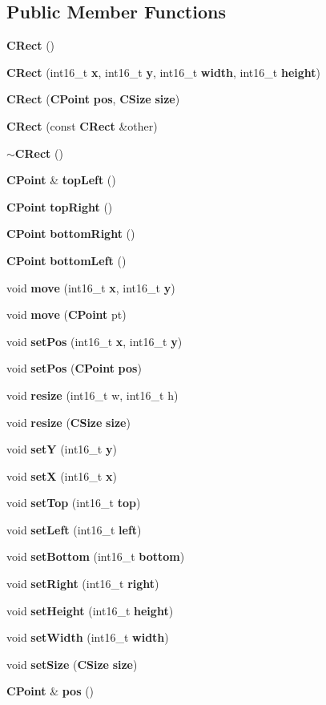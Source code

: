 \subsection*{Public Member Functions}
\begin{DoxyCompactItemize}
\item 
{\bf C\-Rect} ()
\item 
{\bf C\-Rect} (int16\-\_\-t {\bf x}, int16\-\_\-t {\bf y}, int16\-\_\-t {\bf width}, int16\-\_\-t {\bf height})
\item 
{\bf C\-Rect} ({\bf C\-Point} {\bf pos}, {\bf C\-Size} {\bf size})
\item 
{\bf C\-Rect} (const {\bf C\-Rect} \&other)
\item 
{\bf $\sim$\-C\-Rect} ()
\item 
{\bf C\-Point} \& {\bf top\-Left} ()
\item 
{\bf C\-Point} {\bf top\-Right} ()
\item 
{\bf C\-Point} {\bf bottom\-Right} ()
\item 
{\bf C\-Point} {\bf bottom\-Left} ()
\item 
void {\bf move} (int16\-\_\-t {\bf x}, int16\-\_\-t {\bf y})
\item 
void {\bf move} ({\bf C\-Point} pt)
\item 
void {\bf set\-Pos} (int16\-\_\-t {\bf x}, int16\-\_\-t {\bf y})
\item 
void {\bf set\-Pos} ({\bf C\-Point} {\bf pos})
\item 
void {\bf resize} (int16\-\_\-t w, int16\-\_\-t h)
\item 
void {\bf resize} ({\bf C\-Size} {\bf size})
\item 
void {\bf set\-Y} (int16\-\_\-t {\bf y})
\item 
void {\bf set\-X} (int16\-\_\-t {\bf x})
\item 
void {\bf set\-Top} (int16\-\_\-t {\bf top})
\item 
void {\bf set\-Left} (int16\-\_\-t {\bf left})
\item 
void {\bf set\-Bottom} (int16\-\_\-t {\bf bottom})
\item 
void {\bf set\-Right} (int16\-\_\-t {\bf right})
\item 
void {\bf set\-Height} (int16\-\_\-t {\bf height})
\item 
void {\bf set\-Width} (int16\-\_\-t {\bf width})
\item 
void {\bf set\-Size} ({\bf C\-Size} {\bf size})
\item 
{\bf C\-Point} \& {\bf pos} ()

\end{DoxyCompactItemize}
